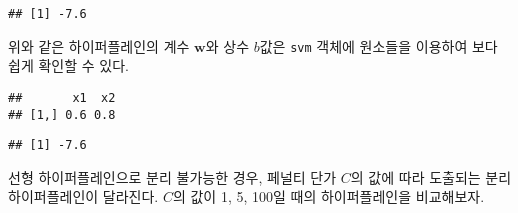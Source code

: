 \documentclass[]{book}
\newenvironment{Shaded}{\begin{snugshade}}{\end{snugshade}}
\newcommand{\KeywordTok}[1]{\textcolor[rgb]{0.13,0.29,0.53}{\textbf{#1}}}
\newcommand{\NormalTok}[1]{#1}
\newcommand{\OperatorTok}[1]{\textcolor[rgb]{0.81,0.36,0.00}{\textbf{#1}}}
\newcommand{\StringTok}[1]{\textcolor[rgb]{0.31,0.60,0.02}{#1}}
\begin{document}
\begin{verbatim}
## [1] -7.6
\end{verbatim}

위와 같은 하이퍼플레인의 계수 \(\mathbf{w}\)와 상수 \(b\)값은 \texttt{svm} 객체에 원소들을 이용하여 보다 쉽게 확인할 수 있다.

\begin{Shaded}
\end{Shaded}

\begin{verbatim}
##       x1  x2
## [1,] 0.6 0.8
\end{verbatim}

\begin{Shaded}
\end{Shaded}

\begin{verbatim}
## [1] -7.6
\end{verbatim}

선형 하이퍼플레인으로 분리 불가능한 경우, 페널티 단가 \(C\)의 값에 따라 도출되는 분리 하이퍼플레인이 달라진다. \(C\)의 값이 1, 5, 100일 때의 하이퍼플레인을 비교해보자.
\end{document}
